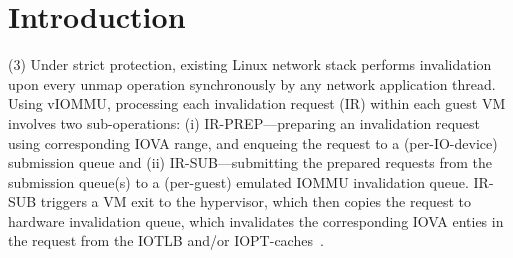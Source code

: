 \section{Introduction}



(3) Under strict protection, existing Linux network stack performs invalidation upon every unmap operation synchronously by any network application thread. Using {vIOMMU}, processing each invalidation request (IR) within each guest VM involves two sub-operations: (i) IR-PREP---preparing an invalidation request using corresponding IOVA range, and enqueing the request to a (per-IO-device) submission queue and (ii) IR-SUB---submitting the prepared requests from the submission queue(s) to a (per-guest) emulated IOMMU invalidation queue.
IR-SUB triggers a VM exit to the hypervisor, which then copies the request to hardware invalidation queue, which invalidates the corresponding IOVA enties in the request from the IOTLB and/or IOPT-caches~\cite{Rubin2024FastSafe}. 





